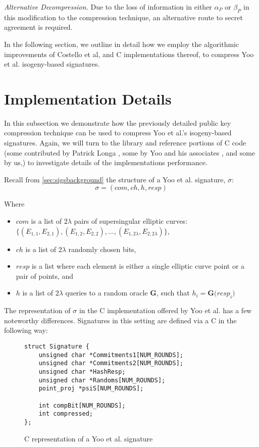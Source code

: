 \noindent
\textit{Alternative Decompression.} Due to the loss of information in either $\alpha_{P}$ or $\beta_{P}$ in this modification to the compression technique, an alternative route to secret agreement is required. 

In the following section, we outline in detail how we employ the algorithmic improvements of Costello et al, and C implementations thereof, to compress Yoo et al. isogeny-based signatures. 

\section{Implementation Details}
\label{sec:compimplementation}

In this subsection we demonstrate how the previously detailed public key compression technique can be used to compress Yoo et al.'s isogeny-based signatures. Again, we will turn to the \sidh library and reference portions of C code (some contributed by Patrick Longa \cite{sidhcode}, some by Yoo and his associates \cite{yoosigcode}, and some by us,) to investigate details of the implementations performance.

Recall from \ref{sec:sigsbackground} the structure of a Yoo et al. signature, $\sigma$:
$$
\sigma = (com, ch, h, resp)
$$

\noindent
Where

\begin{itemize}
\item $com$ is a list of $2\lambda$ pairs of supersingular elliptic curves: $\{(E_{1,1}, E_{2,1}), (E_{1,2}, E_{2,2}), ..., (E_{1,2\lambda}, E_{2,2\lambda})\}$,
\item $ch$ is a list of $2\lambda$ randomly chosen bits,
\item $resp$ is a list where each element is either a single elliptic curve point or a pair of points, and
\item $h$ is a list of $2\lambda$ queries to a random oracle \textbf{G}, such that $h_{i} = \textbf{G(}resp_{i}\textbf{)}$
\end{itemize}

The representation of $\sigma$ in the C implementation offered by Yoo et al. has a few noteworthy differences. Signatures in this setting are defined via a C  in the following way:
\begin{figure}[!h]
\begin{lstlisting}
struct Signature {
	unsigned char *Commitments1[NUM_ROUNDS];
	unsigned char *Commitments2[NUM_ROUNDS];
	unsigned char *HashResp;
	unsigned char *Randoms[NUM_ROUNDS];
	point_proj *psiS[NUM_ROUNDS];

	int compBit[NUM_ROUNDS];
	int compressed;
};
\end{lstlisting}
\caption{C representation of a Yoo et al. signature \cite{yoo}}
\label{code:sigstruct}
\end{figure}

